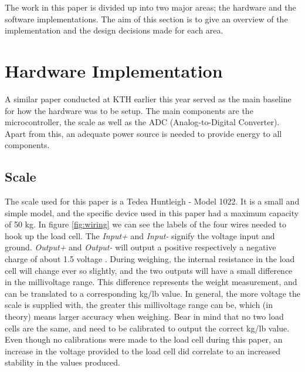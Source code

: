 




The work in this paper is divided up into two major areas; the hardware and the software implementations. The aim of this section is to give an overview of the implementation and the design decisions made for each area.

\section{Hardware Implementation}

A similar paper conducted at KTH earlier this year served as the main baseline for how the hardware was to be setup.\cite{hospital} The main components are the microcontroller, the scale as well as the ADC (Analog-to-Digital Converter). Apart from this, an adequate power source is needed to provide energy to all components. 

\subsection{Scale}
The scale used for this paper is a Tedea Huntleigh - Model 1022. It is a small and simple model, and the specific device used in this paper had a maximum capacity of 50 kg.\cite{load-cell-data} In figure \ref{fig:wiring} we can see the labels of the four wires needed to hook up the load cell. The \textit{Input+} and \textit{Input-} signify the voltage input and ground. \cite{load-cell-spec} \textit{Output+} and \textit{Output-} will output a positive respectively a negative charge of about 1.5 voltage . During weighing, the internal resistance in the load cell will change ever so slightly, and the two outputs will have a small difference in the millivoltage range. This difference represents the weight measurement, and can be translated to a corresponding kg/lb value. In general, the more voltage the scale is supplied with, the greater this millivoltage range can be, which (in theory) means larger accuracy when weighing. Bear in mind that no two load cells are the same, and need to be calibrated to output the correct kg/lb value. Even though no calibrations were made to the load cell during this paper, an increase in the voltage provided to the load cell did correlate to an increased stability in the values produced. 

